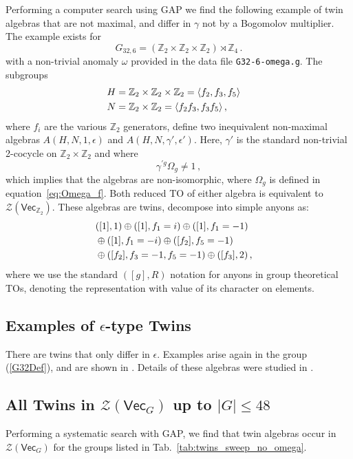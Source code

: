 \documentclass[aps,twocolumn,prx,floatfix,preprintnumbers, nofootinbib,10pt]{revtex4-2}
\numberwithin{equation}{section}
\theoremstyle{definition}
\newcommand{\be}{\begin{equation}}
\newcommand{\ee}{\end{equation}}
\newcommand{\ba}{\begin{aligned}}
\newcommand{\ea}{\end{aligned}}
\newcommand{\Z}{{\mathbb Z}}
\newcommand{\cZ}{\mathcal{Z}}
\renewcommand{\Vec}{\mathsf{Vec}}
\newcommand{\eps}{\epsilon}
\begin{document}
Performing a computer search using GAP \cite{GAP4,HAP,mignard2017moritaequivalencepointedfusion,gruen2021computing} we find the following example of twin algebras that are not maximal, and differ in $\gamma$ not by a Bogomolov multiplier. 
The example exists for 
\be
G_{32,6} = (\Z_2 \times  \Z_2 \times \Z_2) \rtimes \Z_4 \,.
\ee
with a non-trivial anomaly $\omega$ provided in the data file \texttt{G32-6-omega.g}. 
The subgroups 
\be
\ba
H&= \Z_2 \times  \Z_2 \times \Z_2=\langle f_2,f_3,f_5\rangle\cr 
N&= \Z_2 \times \Z_2=\langle f_2f_3,f_3f_5\rangle \,,
\ea
\ee
where $f_i$ are the various $\Z_2$ generators,
define two inequivalent non-maximal algebras $A(H, N, 1, \eps)$ and $A(H, N, \gamma', \eps')$.
Here, $\gamma'$ is the standard non-trivial 2-cocycle on $\Z_2\times\Z_2$ and where 
\be
 \gamma^{\prime g} \Omega_g \neq 1 \,,
\ee
which implies that the algebras are non-isomorphic, where $\Omega_g$ is defined in equation~\eqref{eq:Omega_f}. Both reduced TO of either algebra is equivalent to $\cZ (\Vec_{\Z_2})$. 
These algebras are twins, decompose into simple anyons as: 
\be
\ba
&([1],1) \oplus ([1],f_1=i) \oplus ([1], f_1=-1) \cr
& \oplus ([1],f_1=-i) \oplus ([f_2],f_5=-1) \cr 
&\oplus ([f_2],f_3=-1 ,f_5=-1) \oplus ([f_3],2)  \,,
\ea
\ee
where we use the standard $([g],R)$ notation for anyons in group theoretical TOs, denoting the representation with value of its character on elements.



\subsection{Examples of $\epsilon$-type Twins}
\label{sec:Ex-epstype}

There are twins that only differ in $\epsilon$. Examples arise again in the group (\ref{G32Def}), and are shown in . Details of these algebras were studied in .



\subsection{All Twins in $\cZ(\Vec_G)$ up to $|G|\leq48$}
\label{app:TwinLists}

Performing a systematic search with GAP, we find that twin algebras occur in $\cZ(\Vec_G)$ for the groups listed in Tab.~\ref{tab:twins_sweep_no_omega}.
\end{document}
